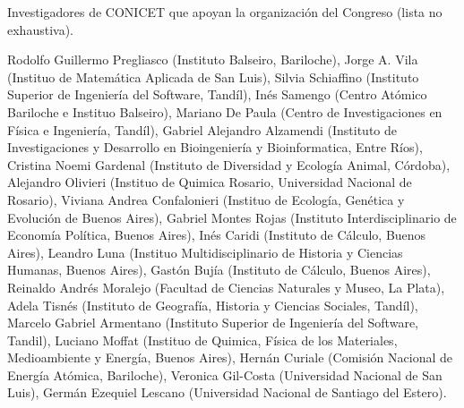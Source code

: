 \documentclass[a4paper,11pt]{article}
\begin{document}
 \vspace{1cm}

Investigadores de CONICET que apoyan la organización del Congreso (lista no exhaustiva).

\vspace{0.3cm}


  \scriptsize
 \noindent  Rodolfo Guillermo Pregliasco (Instituto Balseiro, Bariloche), Jorge A. Vila (Instituo de Matemática Aplicada de San Luis), Silvia Schiaffino (Instituto Superior de Ingeniería del Software, Tandíl), Inés Samengo (Centro Atómico Bariloche e Instituo Balseiro), Mariano De Paula (Centro de Investigaciones en Física e Ingeniería, Tandíl), Gabriel Alejandro Alzamendi (Instituto de Investigaciones y Desarrollo en Bioingeniería y Bioinformatica, Entre Ríos), Cristina Noemi Gardenal (Instituto de Diversidad y Ecología Animal, Córdoba), Alejandro Olivieri (Instituo de Quimica Rosario, Universidad Nacional de Rosario), Viviana Andrea Confalonieri (Instituo de Ecología, Genética y Evolución de Buenos Aires), Gabriel Montes Rojas (Instituto Interdisciplinario de Economía Política, Buenos Aires), Inés Caridi (Instituto de Cálculo, Buenos Aires), Leandro Luna (Instituo Multidisciplinario de Historia y Ciencias Humanas, Buenos Aires), Gastón Bujía (Instituto de Cálculo, Buenos Aires), Reinaldo Andrés	Moralejo (Facultad de Ciencias Naturales y Museo, La Plata), Adela Tisnés (Instituto de Geografía, Historia y Ciencias Sociales, Tandíl), Marcelo Gabriel Armentano (Instituto Superior de Ingeniería del Software, Tandil), Luciano Moffat (Instituo de Quimica, Física de los Materiales, Medioambiente y Energía, Buenos Aires), Hernán Curiale (Comisión Nacional de Energía Atómica, Bariloche), Veronica Gil-Costa (Universidad Nacional de San Luis), Germán Ezequiel Lescano (Universidad Nacional de Santiago del Estero).%
\end{document}
